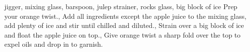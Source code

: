 \documentclass[../main.tex]{subfiles}
\begin{document}
\clearpage
{}

%
{jigger, mixing glass, barspoon, julep strainer, rocks glass, big block of ice}
%
{
	{Prep your orange twist.},
	{Add all ingredients except the apple juice to the mixing glass, add plenty of ice and stir until chilled and diluted.},
	{Strain over a big block of ice and float the apple juice on top.},
	{Give orange twist a sharp fold over the top to expel oils and drop in to garnish.}
}
\end{document}
